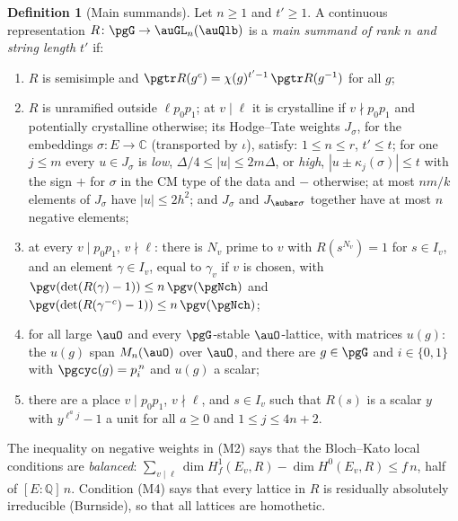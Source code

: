 \documentclass[10pt]{amsart}
\theoremstyle{definition}
\newtheorem{definition}[theorem]{Definition}
\theoremstyle{remark}
\newcommand{\C}{\mathbb C}
\newcommand{\Q}{\mathbb Q}
\begin{document}
\begin{definition}[Main summands]\label{pg:def-summand}
Let $n\ge1$ and $t'\ge1$. A continuous representation $R\colon\pgG\to\auGL_n(\auQlb)$ is a
\emph{main summand of rank $n$ and string length $t'$} if:
\begin{enumerate}
\item[(M1)] $R$ is semisimple and $\pgtr R(g^c)=\chi(g)^{t'-1}\,\pgtr R(g^{-1})$ for all $g$;
\item[(M2)] $R$ is unramified outside $\ell p_0p_1$; at $v\mid\ell$ it is crystalline if
$v\nmid p_0p_1$ and potentially crystalline otherwise; its Hodge--Tate weights $J_\sigma$, for
the embeddings $\sigma\colon E\to\C$ (transported by $\iota$), satisfy:
$1\le n\le r$, $t'\le t$; for one $j\le m$ every $u\in J_\sigma$ is \emph{low},
$\Delta/4\le|u|\le2m\Delta$, or \emph{high}, $|u\pm\kappa_j(\sigma)|\le t$ with the sign $+$ for
$\sigma$ in the CM type of the data and $-$ otherwise; at most $nm/k$ elements of $J_\sigma$ have
$|u|\le2h^2$; and $J_\sigma$ and $J_{\aubar\sigma}$ together have at most $n$ negative elements;
\item[(M3)] at every $v\mid p_0p_1$, $v\nmid\ell$: there is $N_v$ prime to $v$ with $R(s^{N_v})=1$
for $s\in I_v$, and an element $\gamma\in I_v$, equal to $\gamma_v$ if $v$ is chosen, with
$\pgv(\det(R(\gamma)-1))\le n\,\pgv(\pgNch)$ and $\pgv(\det(R(\gamma^{-c})-1))\le n\,\pgv(\pgNch)$;
\item[(M4)] for all large $\auO$ and every $\pgG$-stable $\auO$-lattice, with matrices $u(g)$: the
$u(g)$ span $M_n(\auO)$ over $\auO$, and there are $g\in\pgG$ and $i\in\{0,1\}$ with
$\pgcyc(g)=p_i^{\,n}$ and $u(g)$ a scalar;
\item[(M5)] there are a place $v\mid p_0p_1$, $v\nmid\ell$, and $s\in I_v$ such that $R(s)$ is a
scalar $y$ with $y^{\ell^aj}-1$ a unit for all $a\ge0$ and $1\le j\le4n+2$.
\end{enumerate}
\end{definition}

The inequality on negative weights in (M2) says that the Bloch--Kato local conditions are
\emph{balanced}: $\sum_{v\mid\ell}\dim H^1_f(E_v,R)-\dim H^0(E_v,R)\le f\,n$, half of
$[E:\Q]\,n$. Condition (M4) says that every lattice in $R$ is residually absolutely irreducible
(Burnside), so that all lattices are homothetic.
\end{document}
